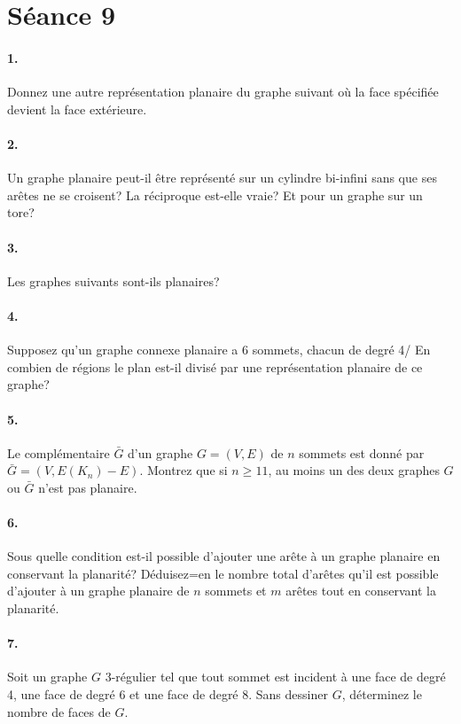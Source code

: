 \section{Séance 9}

\paragraph{1. } Donnez une autre représentation planaire du graphe suivant où la face spécifiée devient la face extérieure. 

\paragraph{2. }Un graphe planaire peut-il être représenté sur un cylindre bi-infini sans que ses arêtes ne se croisent? La réciproque est-elle vraie? Et pour un graphe sur un tore? 

\paragraph{3. }Les graphes suivants sont-ils planaires?

\paragraph{4. }Supposez qu'un graphe connexe planaire a 6 sommets, chacun de degré 4/ En combien de régions le plan est-il divisé par une représentation planaire de ce graphe?

\paragraph{5. }Le complémentaire $\bar{G}$ d'un graphe $G = (V,E)$ de $n$ sommets est donné par $\bar{G} = (V, E(K_n)-E)$. Montrez que si $n \geq 11$, au moins un des deux graphes $G$ ou $\bar{G}$ n'est pas planaire.

\paragraph{6. }Sous quelle condition est-il possible d'ajouter une arête à un graphe planaire en conservant la planarité? Déduisez=en le nombre total d'arêtes qu'il est possible d'ajouter à un graphe planaire de $n$ sommets et $m$ arêtes tout en conservant la planarité.

\paragraph{7. }Soit un graphe $G$ 3-régulier tel que tout sommet est incident à une face de degré 4, une face de degré 6 et une face de degré 8. Sans dessiner $G$, déterminez le nombre de faces de $G$.

